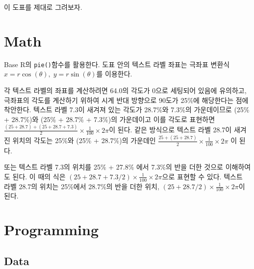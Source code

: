 \documentclass[
]{article}
\begin{document}
이 도표를 제대로 그려보자.

\hypertarget{math}{%
\section{Math}\label{math}}

Base R의 \texttt{pie()}함수를 활용한다. 도표 안의 텍스트 라벨 좌표는
극좌표 변환식 \(x = r \cos(\theta),\; y = r \sin(\theta)\)를 이용한다.

각 텍스트 라벨의 좌표를 계산하려면 64.0의 각도가 0으로 세팅되어 있음에
유의하고, 극좌표의 각도를 계산하기 위하여 시계 반대 방향으로 90도가
25\%에 해당한다는 점에 착안한다. 텍스트 라벨 7.3이 새겨져 있는 각도가
28.7\%와 7.3\%의 가운데이므로 (25\% + 28.7\%)와 (25\% + 28.7\% +
7.3\%)의 가운데이고 이를 각도로 표현하면
\(\frac{(25 + 28.7) + (25 + 28.7 + 7.3)}{2}\times\frac{1}{100}\times2\pi\)이
된다. 같은 방식으로 텍스트 라벨 28.7이 새겨진 위치의 각도는 25\%와 (25\%
+ 28.7\%)의 가운데인
\(\frac{25 + (25 + 28.7)}{2}\times\frac{1}{100}\times2\pi\) 이 된다.

또는 텍스트 라벨 7.3의 위치를 25\% + 27.8\% 에서 7.3\%의 반을 더한
것으로 이해하여도 된다. 이 때의 식은
\((25 + 28.7 + 7.3/2)\times\frac{1}{100}\times2\pi\)으로 표현할 수 있다.
텍스트 라벨 28.7의 위치는 25\%에서 28.7\%의 반을 더한 위치,
\((25 + 28.7/2)\times\frac{1}{100}\times2\pi\)이 된다.

\hypertarget{programming}{%
\section{Programming}\label{programming}}

\hypertarget{data}{%
\subsection{Data}\label{data}}
\end{document}
